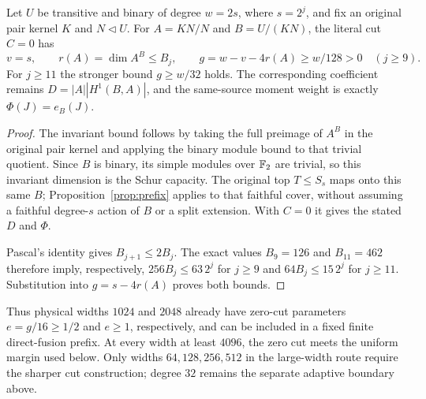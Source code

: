 \begin{lemma}\label{lem:binary-zero-cut}
Let $U$ be transitive and binary of degree $w=2s$, where $s=2^j$,
and fix an original pair kernel $K$ and $N\lhd U$.
For $A=KN/N$ and $B=U/(KN)$, the literal cut $C=0$ has
\[
 v=s,\qquad r(A)=\dim A^B\leq B_j,\qquad
 g=w-v-4r(A)\geq w/128>0\quad(j\geq9).
\]
For $j\geq11$ the stronger bound $g\geq w/32$ holds.
The corresponding coefficient remains $D=|A||H^1(B,A)|$, and
the same-source moment weight is exactly $\Phi(J)=e_B(J)$.
\end{lemma}
\begin{proof}
The invariant bound follows by taking the full preimage of $A^B$
in the original pair kernel and applying the binary module bound
to that trivial quotient. Since $B$ is binary, its simple modules
over $\mathbb F_2$ are trivial, so this invariant dimension is the Schur
capacity. The original top $T\leq S_s$ maps onto this same $B$;
Proposition~\ref{prop:prefix} applies to that faithful cover, without
assuming a faithful degree-$s$ action of $B$ or a split extension.
With $C=0$ it gives the stated $D$ and $\Phi$.

Pascal's identity gives $B_{j+1}\leq2B_j$. The exact values
$B_9=126$ and $B_{11}=462$ therefore imply, respectively,
$256B_j\leq63\,2^j$ for $j\geq9$ and
$64B_j\leq15\,2^j$ for $j\geq11$.
Substitution into $g=s-4r(A)$ proves both bounds.
\end{proof}

Thus physical widths $1024$ and $2048$ already have zero-cut
parameters $e=g/16\geq1/2$ and $e\geq1$, respectively, and can
be included in a fixed finite direct-fusion prefix. At every width
at least $4096$, the zero cut meets the uniform margin used below.
Only widths $64,128,256,512$ in the large-width route require
the sharper cut construction; degree $32$ remains the separate
adaptive boundary above.

